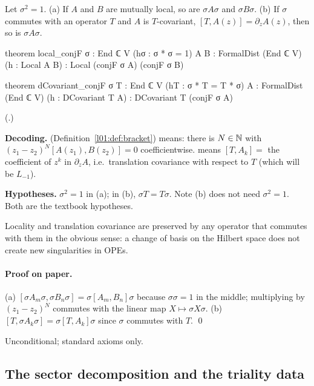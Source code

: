\begin{proposition}\label{ch14:prop:conj}
Let $\sigma^2=1$.  (a) If $A$ and $B$ are mutually local, so are $\sigma A\sigma$ and $\sigma B\sigma$.
(b) If $\sigma$ commutes with an operator $T$ and $A$ is $T$-covariant, $[T,A(z)]=\partial_zA(z)$,
then so is $\sigma A\sigma$.
\end{proposition}
\begin{leancode}
theorem local_conjF {σ : End ℂ V} (hσ : σ * σ = 1) {A B : FormalDist (End ℂ V)}
    (h : Local A B) : Local (conjF σ A) (conjF σ B)

theorem dCovariant_conjF {σ T : End ℂ V} (hT : σ * T = T * σ)
    {A : FormalDist (End ℂ V)} (h : DCovariant T A) : DCovariant T (conjF σ A)
\end{leancode}
(.)

\begin{dictionary}
\textbf{Decoding.}   (Definition~\ref{l01:def:bracket}) means: there is $N\in{\mathbb{N}}$ with
$(z_1-z_2)^N[A(z_1),B(z_2)]=0$ coefficientwise.   means
$[T,A_k]=$ the coefficient of $z^k$ in $\partial_z A$, i.e.\ translation covariance with respect to
$T$ (which will be $L_{-1}$).

\textbf{Hypotheses.}  $\sigma^2=1$ in (a); in (b), $\sigma T=T\sigma$.  Note (b) does not need
$\sigma^2=1$.  Both are the textbook hypotheses.
\end{dictionary}
\begin{physics}
Locality and translation covariance are preserved by any operator that commutes with them in the obvious sense: a change of basis on the Hilbert space does not create new singularities in OPEs.
\end{physics}


\paragraph{Proof on paper.}  (a) $[\sigma A_m\sigma,\sigma B_n\sigma]=\sigma[A_m,B_n]\sigma$ because
$\sigma\sigma=1$ in the middle; multiplying by $(z_1-z_2)^N$ commutes with the linear map
$X\mapsto\sigma X\sigma$.  (b) $[T,\sigma A_k\sigma]=\sigma[T,A_k]\sigma$ since $\sigma$ commutes
with $T$. \qed

\begin{status}Unconditional; standard axioms only.\end{status}

\subsection{The sector decomposition and the triality data}


